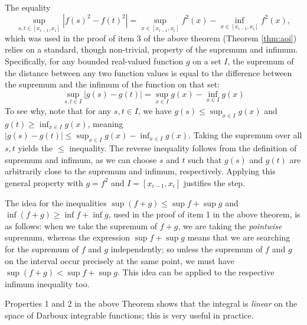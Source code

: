 \documentclass[../analysis1.tex]{subfiles}
\begin{document}
\begin{remark}
    The equality 
    \[ \sup_{s,t \in [x_{i-1}, x_i]} |f(s)^2 - f(t)^2| = \sup_{x \in [x_{i-1}, x_i]} f^2(x) - \inf_{x \in [x_{i-1}, x_i]} f^2(x),\]
    which was used in the proof of item 3 of the above theorem (Theorem \ref{thm:aoi}) relies on a standard, though non-trivial, property of the supremum and infimum. Specifically, for any bounded real-valued function $g$ on a set $I$, the supremum of the distance between any two function values is equal to the difference between the supremum and the infimum of the function on that set:
    \[ \sup_{s,t \in I} |g(s) - g(t)| = \sup_{x \in I} g(x) - \inf_{x \in I} g(x) \]
    To see why, note that for any $s, t \in I$, we have $g(s) \leq \sup_{x \in I} g(x)$ and $g(t) \geq \inf_{x \in I} g(x)$, meaning $|g(s) - g(t)| \leq \sup_{x \in I} g(x) - \inf_{x \in I} g(x)$. Taking the supremum over all $s,t$ yields the $\leq$ inequality. The reverse inequality follows from the definition of supremum and infimum, as we can choose $s$ and $t$ such that $g(s)$ and $g(t)$ are arbitrarily close to the supremum and infimum, respectively. Applying this general property with $g = f^2$ and $I = [x_{i-1}, x_i]$ justifies the step.
\end{remark}

\begin{remark}
    The idea for the inequalities $\sup(f+g) \le \sup f + \sup g$ and $\inf(f+g) \ge \inf f + \inf g$, used in the proof of item 1 in the above theorem, is as follows: when we take the supremum of $f+g$, we are taking the \textit{pointwise} supremum, whereas the expression $\sup f+\sup g$ means that we are searching for the supremum of $f$ and $g$ independently; so unless the supremum of $f$ and $g$ on the interval occur precisely at the same point, we must have $\sup (f+g)< \sup f + \sup g$. This idea can be applied to the respective infimum inequality too.
\end{remark}

Properties 1 and 2 in the above Theorem shows that the integral is \textit{linear} on the space of Darboux integrable functions; this is very useful in practice.
\end{document}
